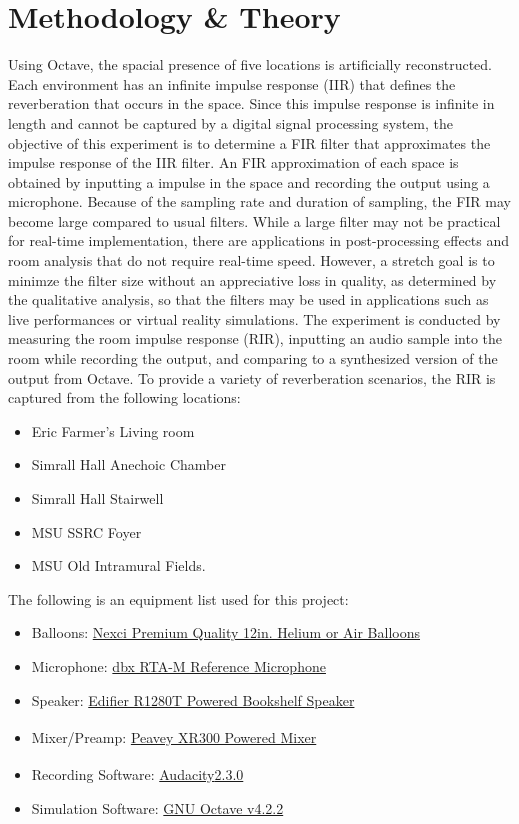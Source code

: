 \documentclass[letterpaper, 11pt, onecolumn, oneside]{article}
\begin{document}
\section{Methodology \& Theory}
Using Octave, the spacial presence of five locations is artificially reconstructed.
Each environment has an infinite impulse response (IIR) that defines the reverberation that occurs in the space.
Since this impulse response is infinite in length and cannot be captured by a digital signal processing system, the objective of this experiment is to determine a FIR filter that approximates the impulse response of the IIR filter.
An FIR approximation of each space is obtained by inputting a impulse in the space and recording the output using a microphone.
Because of the sampling rate and duration of sampling, the FIR may become large compared to usual filters.
While a large filter may not be practical for real-time implementation, there are applications in post-processing effects and room analysis that do not require real-time speed.
However, a stretch goal is to minimze the filter size without an appreciative loss in quality, as determined by the qualitative analysis, so that the filters may be used in applications such as live performances or virtual reality simulations.
The experiment is conducted by measuring the room impulse response (RIR), inputting an audio sample into the room while recording the output, and comparing to a synthesized version of the output from Octave.
To provide a variety of reverberation scenarios, the RIR is captured from the following locations:
\begin{itemize}
    \item Eric Farmer's Living room
    \item Simrall Hall Anechoic Chamber
    \item Simrall Hall Stairwell
    \item MSU SSRC Foyer
    \item MSU Old Intramural Fields.
\end{itemize}

The following is an equipment list used for this project:
\begin{itemize}
    \item Balloons: \href{https://www.amazon.com/gp/product/B01LBTKVDY/ref=oh_aui_detailpage_o04_s00?ie=UTF8&psc=1}{Nexci Premium Quality 12in. Helium or Air Balloons}
    \item Microphone: \href{https://dbxpro.com/en/products/rta-m}{dbx RTA-M Reference Microphone}
    \item Speaker: \href{https://www.edifier.com/int/en/speakers/studio-1280t-2.0-powered-bookshelf}{Edifier R1280T Powered Bookshelf Speaker}
    \item Mixer/Preamp: \href{https://assets.peavey.com/literature/manuals/117405_9170.pdf}{Peavey XR\texorpdfstring{\textsuperscript{\textregistered}} 8300 Powered Mixer}
    \item Recording Software: \href{https://www.audacityteam.org/}{Audacity\texorpdfstring{\textsuperscript{\textregistered}} v2.3.0}
    \item Simulation Software: \href{https://www.gnu.org/software/octave/}{GNU Octave v4.2.2}
\end{itemize}
\end{document}
